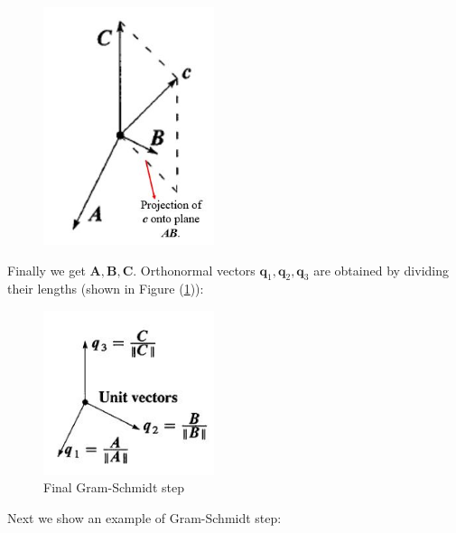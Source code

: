 \begin{figure}[H]\centering
\includegraphics[width=5cm]{week5/nextgram}
\end{figure}
Finally we get $\bm A,\bm B,\bm C$. Orthonormal vectors $\bm q_1,\bm q_2,\bm q_3$ are obtained by dividing their lengths (shown in Figure (\ref{Final_gram})):
\begin{figure}[H]\centering
\includegraphics[width=5cm]{week5/finalgram}
\caption{Final Gram-Schmidt step}
\label{Final_gram}
\end{figure}
Next we show an example of Gram-Schmidt step:
